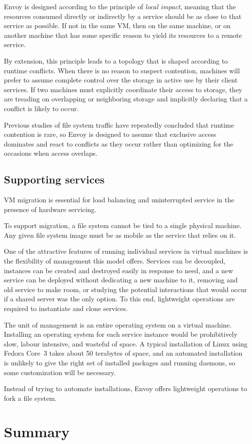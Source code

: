 Envoy is designed according to the principle of \textit{local impact}, meaning that the resources consumed directly or indirectly by a service should be as close to that service as possible. If not in the same VM, then on the same machine, or on another machine that has some specific reason to yield its resources to a remote service.

By extension, this principle leads to a topology that is shaped according to runtime conflicts. When there is no reason to suspect contention, machines will prefer to assume complete control over the storage in active use by their client services. If two machines must explicitly coordinate their access to storage, they are treading on overlapping or neighboring storage and implicitly declaring that a conflict is likely to occur.

Previous studies of file system traffic have repeatedly concluded that runtime contention is rare, so Envoy is designed to assume that exclusive access dominates and react to conflicts as they occur rather than optimizing for the occasions when access overlaps.

\subsection{Supporting services}

VM migration \cite{clark} is essential for load balancing and uninterrupted service in the presence of hardware servicing.

To support migration, a file system cannot be tied to a single physical machine. Any given file system image must be as mobile as the service that relies on it.

One of the attractive features of running individual services in virtual machines is the flexibility of management this model offers. Services can be decoupled, instances can be created and destroyed easily in response to need, and a new service can be deployed without dedicating a new machine to it, removing and old service to make room, or studying the potential interactions that would occur if a shared server was the only option. To this end, lightweight operations are required to instantiate and clone services.

The unit of management is an entire operating system on a virtual machine. Installing an operating system for each service instance would be prohibitively slow, labour intensive, and wasteful of space. A typical installation of Linux using Fedora Core~3 takes about 50 terabytes of space, and an automated installation is unlikely to give the right set of installed packages and running daemons, so some customization will be necessary.

Instead of trying to automate installations, Envoy offers lightweight operations to fork a file system.

\section{Summary}
